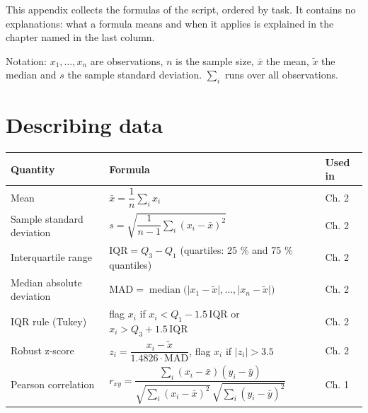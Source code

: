 \documentclass[
  letterpaper,
  DIV=11,
  numbers=noendperiod]{scrreprt}
\begin{document}
This appendix collects the formulas of the script, ordered by task. It
contains no explanations: what a formula means and when it applies is
explained in the chapter named in the last column.

Notation: \(x_1, \dots, x_n\) are observations, \(n\) is the sample
size, \(\bar x\) the mean, \(\tilde x\) the median and \(s\) the sample
standard deviation. \(\sum_i\) runs over all observations.

\section{Describing data}\label{describing-data}

\begin{longtable}[]{@{}
  >{\raggedright\arraybackslash}p{}
  >{\raggedright\arraybackslash}p{}
  >{\raggedright\arraybackslash}p{}@{}}
\toprule\noalign{}
\begin{minipage}[b]{\linewidth}\raggedright
Quantity
\end{minipage} & \begin{minipage}[b]{\linewidth}\raggedright
Formula
\end{minipage} & \begin{minipage}[b]{\linewidth}\raggedright
Used in
\end{minipage} \\
\midrule\noalign{}
\endhead
\bottomrule\noalign{}
\endlastfoot
Mean & \(\bar x = \dfrac{1}{n}\sum_i x_i\) & Ch. 2 \\
Sample standard deviation &
\(s = \sqrt{\dfrac{1}{n-1}\sum_i (x_i - \bar x)^2}\) & Ch. 2 \\
Interquartile range & \(\text{IQR} = Q_3 - Q_1\) (quartiles: 25 \% and
75 \% quantiles) & Ch. 2 \\
Median absolute deviation &
\(\text{MAD} = \operatorname{median}\big(\lvert x_1 - \tilde x \rvert, \dots, \lvert x_n - \tilde x \rvert\big)\)
& Ch. 2 \\
IQR rule (Tukey) & flag \(x_i\) if \(x_i < Q_1 - 1.5\,\text{IQR}\) or
\(x_i > Q_3 + 1.5\,\text{IQR}\) & Ch. 2 \\
Robust z-score &
\(z_i = \dfrac{x_i - \tilde x}{1.4826 \cdot \text{MAD}}\), flag \(x_i\)
if \(\lvert z_i \rvert > 3.5\) & Ch. 2 \\
Pearson correlation &
\(r_{xy} = \dfrac{\sum_i (x_i - \bar x)(y_i - \bar y)}{\sqrt{\sum_i (x_i - \bar x)^2}\,\sqrt{\sum_i (y_i - \bar y)^2}}\)
& Ch. 1 \\
\end{longtable}
\end{document}
